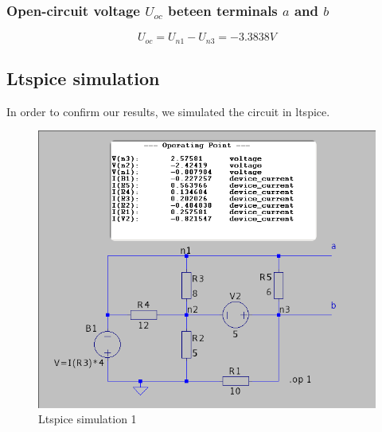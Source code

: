 \documentclass[a4paper]{article}
\begin{document}
\subsubsection{Open-circuit voltage $U_{oc}$ beteen terminals $a$ and $b$}
\begin{equation*}
   U_{oc}=U_{n1} - U_{n3} = -3.3838 V
\end{equation*}
\subsection{Ltspice simulation}
In order to confirm our results, we simulated the circuit in ltspice.
\begin{figure}[h!] \centering
   \includegraphics[scale=0.5]{./Figures/ltspice.png} 
\caption{Ltspice simulation 1} 
\label{fig:ltspice_1}
\end{figure}
\clearpage
\end{document}
